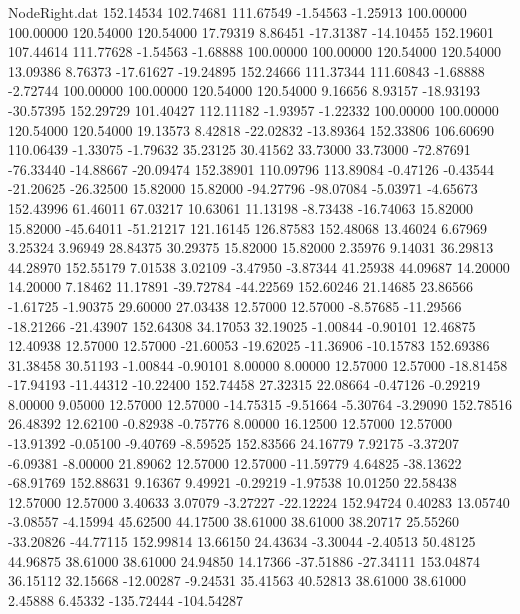 \begin{filecontents}{NodeRight.dat}
 152.14534  102.74681  111.67549    -1.54563   -1.25913  100.00000  100.00000  120.54000  120.54000   17.79319    8.86451  -17.31387  -14.10455
 152.19601  107.44614  111.77628    -1.54563   -1.68888  100.00000  100.00000  120.54000  120.54000   13.09386    8.76373  -17.61627  -19.24895
 152.24666  111.37344  111.60843    -1.68888   -2.72744  100.00000  100.00000  120.54000  120.54000    9.16656    8.93157  -18.93193  -30.57395
 152.29729  101.40427  112.11182    -1.93957   -1.22332  100.00000  100.00000  120.54000  120.54000   19.13573    8.42818  -22.02832  -13.89364
 152.33806  106.60690  110.06439    -1.33075   -1.79632   35.23125   30.41562   33.73000   33.73000  -72.87691  -76.33440  -14.88667  -20.09474
 152.38901  110.09796  113.89084    -0.47126   -0.43544  -21.20625  -26.32500   15.82000   15.82000  -94.27796  -98.07084   -5.03971   -4.65673
 152.43996   61.46011   67.03217    10.63061   11.13198   -8.73438  -16.74063   15.82000   15.82000  -45.64011  -51.21217  121.16145  126.87583
 152.48068   13.46024    6.67969     3.25324    3.96949   28.84375   30.29375   15.82000   15.82000    2.35976    9.14031   36.29813   44.28970
 152.55179    7.01538    3.02109    -3.47950   -3.87344   41.25938   44.09687   14.20000   14.20000    7.18462   11.17891  -39.72784  -44.22569
 152.60246   21.14685   23.86566    -1.61725   -1.90375   29.60000   27.03438   12.57000   12.57000   -8.57685  -11.29566  -18.21266  -21.43907
 152.64308   34.17053   32.19025    -1.00844   -0.90101   12.46875   12.40938   12.57000   12.57000  -21.60053  -19.62025  -11.36906  -10.15783
 152.69386   31.38458   30.51193    -1.00844   -0.90101    8.00000    8.00000   12.57000   12.57000  -18.81458  -17.94193  -11.44312  -10.22400
 152.74458   27.32315   22.08664    -0.47126   -0.29219    8.00000    9.05000   12.57000   12.57000  -14.75315   -9.51664   -5.30764   -3.29090
 152.78516   26.48392   12.62100    -0.82938   -0.75776    8.00000   16.12500   12.57000   12.57000  -13.91392   -0.05100   -9.40769   -8.59525
 152.83566   24.16779    7.92175    -3.37207   -6.09381   -8.00000   21.89062   12.57000   12.57000  -11.59779    4.64825  -38.13622  -68.91769
 152.88631    9.16367    9.49921    -0.29219   -1.97538   10.01250   22.58438   12.57000   12.57000    3.40633    3.07079   -3.27227  -22.12224
 152.94724    0.40283   13.05740    -3.08557   -4.15994   45.62500   44.17500   38.61000   38.61000   38.20717   25.55260  -33.20826  -44.77115
 152.99814   13.66150   24.43634    -3.30044   -2.40513   50.48125   44.96875   38.61000   38.61000   24.94850   14.17366  -37.51886  -27.34111
 153.04874   36.15112   32.15668   -12.00287   -9.24531   35.41563   40.52813   38.61000   38.61000    2.45888    6.45332 -135.72444 -104.54287

\end{filecontents}
